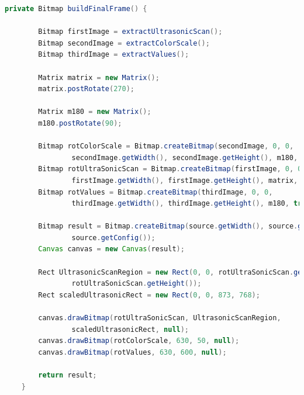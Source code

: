 \begin{lstlisting}[caption=Methode zum Zusammenstellen des Ausgabeframes, label=lst:buildFinalFrame, language=Java]
private Bitmap buildFinalFrame() {

        Bitmap firstImage = extractUltrasonicScan();
        Bitmap secondImage = extractColorScale();
        Bitmap thirdImage = extractValues();

        Matrix matrix = new Matrix();
        matrix.postRotate(270);

        Matrix m180 = new Matrix();
        m180.postRotate(90);

        Bitmap rotColorScale = Bitmap.createBitmap(secondImage, 0, 0,
                secondImage.getWidth(), secondImage.getHeight(), m180, true);
        Bitmap rotUltraSonicScan = Bitmap.createBitmap(firstImage, 0, 0,
                firstImage.getWidth(), firstImage.getHeight(), matrix, true);
        Bitmap rotValues = Bitmap.createBitmap(thirdImage, 0, 0,
                thirdImage.getWidth(), thirdImage.getHeight(), m180, true);

        Bitmap result = Bitmap.createBitmap(source.getWidth(), source.getHeight(),
                source.getConfig());
        Canvas canvas = new Canvas(result);

        Rect UltrasonicScanRegion = new Rect(0, 0, rotUltraSonicScan.getWidth(),
                rotUltraSonicScan.getHeight());
        Rect scaledUltrasonicRect = new Rect(0, 0, 873, 768);

        canvas.drawBitmap(rotUltraSonicScan, UltrasonicScanRegion,
                scaledUltrasonicRect, null);
        canvas.drawBitmap(rotColorScale, 630, 50, null);
        canvas.drawBitmap(rotValues, 630, 600, null);

        return result;
    }
\end{lstlisting}


